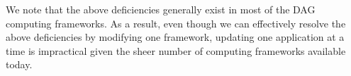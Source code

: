 We note that the above deficiencies generally exist in most of the DAG computing frameworks. 
As a result, even though we can effectively resolve the above deficiencies by modifying one framework, updating one application at a time is impractical given the sheer number of computing frameworks available today.










